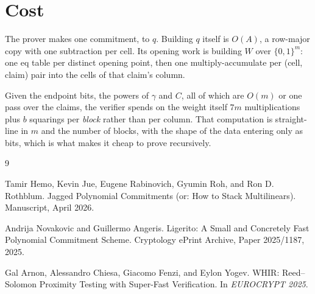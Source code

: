 \documentclass[11pt]{article}
\newcommand{\eq}{\mathrm{eq}}
\newcommand{\cube}[1]{\{0,1\}^{#1}}
\theoremstyle{plain}
\begin{document}
\section{Cost}\label{sec:cost}

The prover makes one commitment, to $q$. Building $q$ itself is $O(A)$, a row-major copy with
one subtraction per cell. Its opening work is building $W$ over $\cube m$: one $\eq$ table per
distinct opening point, then one multiply-accumulate per (cell, claim) pair into the cells of
that claim's column.

Given the endpoint bits, the powers of $\gamma$ and $C$, all of which are $O(m)$ or one pass
over the claims, the verifier spends on the weight itself $7m$ multiplications plus $b$
squarings per \emph{block} rather than per column. That computation is straight-line in $m$ and
the number of blocks, with the shape of the data entering only as bits, which is what makes it
cheap to prove recursively.

\begin{thebibliography}{9}

 Tamir Hemo, Kevin Jue, Eugene Rabinovich, Gyumin Roh, and Ron D. Rothblum.
Jagged Polynomial Commitments (or: How to Stack Multilinears). Manuscript, April 2026.

 Andrija Novakovic and Guillermo Angeris. Ligerito: A Small and Concretely
Fast Polynomial Commitment Scheme. Cryptology ePrint Archive, Paper 2025/1187, 2025.

 Gal Arnon, Alessandro Chiesa, Giacomo Fenzi, and Eylon Yogev. WHIR:
Reed--Solomon Proximity Testing with Super-Fast Verification. In \emph{EUROCRYPT 2025}.

\end{thebibliography}
\end{document}
